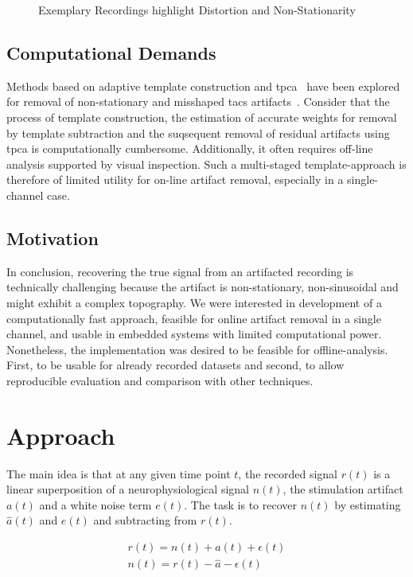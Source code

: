 \documentclass[a4paper]{article}
\begin{document}
\begin{figure}[hbtp]
    \caption{Exemplary Recordings highlight Distortion and Non-Stationarity}\label{fig:nonsinus}
\end{figure}

\subsection{Computational Demands}

Methods based on adaptive template construction and \gls{tpca}~\citep{Niazy_2005} have been explored for removal of  non-stationary and misshaped \gls{tacs} artifacts~\citep{Helfrich_2014}.
Consider that the process of template construction, the estimation of accurate weights for removal by template subtraction and the suqsequent removal of residual artifacts using \gls{tpca} is computationally cumbersome. Additionally, it often requires off-line analysis supported by visual inspection.
Such a multi-staged template-approach is therefore of limited utility for on-line artifact removal, especially in a single-channel case.

\subsection{Motivation}

In conclusion, recovering the true signal from an artifacted recording is technically challenging because the artifact is non-stationary, non-sinusoidal and might exhibit a complex topography. We were interested in development of a computationally fast approach, feasible for online artifact removal in a single channel, and usable in embedded systems with limited computational power.
Nonetheless, the implementation was desired to be feasible for offline-analysis. First, to be usable for already recorded datasets and second, to allow reproducible evaluation and comparison with other techniques.

\section{Approach}

The main idea is that at any given time point $t$, the recorded signal $r(t)$ is a linear super\-position of a neurophysiological signal $n(t)$, the stimulation artifact $a(t)$ and a white noise term $e(t)$. The task is to recover $n(t)$ by estimating $\hat{a}(t)$ and $e(t)$ and subtracting from $r(t)$.

\begin{eqnarray}
    r(t) = n(t) + a(t) + \epsilon(t)\\
    n(t) = r(t) - \hat{a} - \epsilon(t)
\end{eqnarray}
\end{document}
